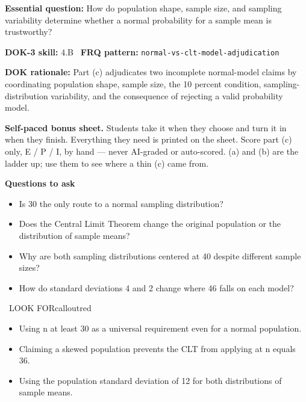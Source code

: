 \documentclass[11pt]{article}
\begin{document}
\textbf{Essential question:} How do population shape, sample size, and sampling variability determine whether a normal probability for a sample mean is trustworthy?\par
\textbf{DOK-3 skill:} 4.B \textperiodcentered\ \textbf{FRQ pattern:} {\small\texttt{normal-\allowbreak{}vs-\allowbreak{}clt-\allowbreak{}model-\allowbreak{}adjudication}}\par
\textbf{DOK rationale:} Part (c) adjudicates two incomplete normal-model claims by coordinating population shape, sample size, the 10 percent condition, sampling-distribution variability, and the consequence of rejecting a valid probability model.\par

\textbf{Self-paced bonus sheet.} Students take it when they choose and turn it in when they finish. Everything they need is printed on the sheet. Score part (c) only, E / P / I, by hand --- never AI-graded or auto-scored. (a) and (b) are the ladder up; use them to see where a thin (c) came from.\par

\textbf{Questions to ask}
\begin{itemize}[leftmargin=1.5em,itemsep=2pt,topsep=2pt]
  \item Is 30 the only route to a normal sampling distribution?
  \item Does the Central Limit Theorem change the original population or the distribution of sample means?
  \item Why are both sampling distributions centered at 40 despite different sample sizes?
  \item How do standard deviations 4 and 2 change where 46 falls on each model?
\end{itemize}

\begin{callout}{\IconWarn\ LOOK FOR}{calloutred}
\begin{itemize}[leftmargin=1.5em,itemsep=2pt,topsep=2pt]
  \item Using n at least 30 as a universal requirement even for a normal population.
  \item Claiming a skewed population prevents the CLT from applying at n equals 36.
  \item Using the population standard deviation of 12 for both distributions of sample means.
\end{itemize}
\end{callout}

\end{document}
